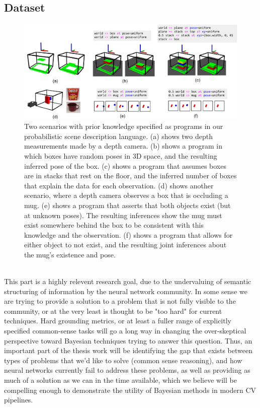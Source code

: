 
\subsection{Dataset}

\begin{figure}[t]
    \centering
    \includegraphics[width=\textwidth]{figures/lafi-fig.pdf}
    \caption{\small
Two scenarios with prior knowledge specified as programs in our probabilistic scene description language.
(a) shows two depth measurements made by a depth camera.
(b) shows a program in which boxes have random poses in 3D space, and the resulting inferred pose of the box.
(c) shows a program that assumes boxes are in stacks that rest on the floor, and the inferred number of boxes that explain the data for each observation.
(d) shows another scenario, where a depth camera observes a box that is occluding a mug.
(e) shows a program that asserts that both objects exist (but at unknown poses).
The resulting inferences show the mug must exist somewhere behind the box to be consistent with this knowledge and the observation.
(f) shows a program that allows for either object to not exist, and the resulting joint inferences about the mug's existence and pose.
}
    \label{fig:results}
\end{figure}

 \\

This part is a highly relevent research goal, due to the undervaluing of
semantic structuring of information by the neural network community. In some
sense we are trying to provide a solution to a problem that is not fully
visible to the community, or at the very least is thought to be "too hard" for
current techniques. Hard grounding metrics, or at least a fuller range of
explicitly specified common-sense tasks will go a long way in changing the
over-skeptical perspective toward Bayesian techniques trying to answer this
question. Thus, an important part of the thesis work will be identifying the
gap that exists between types of problems that we'd like to solve (common sense
reasoning), and how neural networks currently fail to address these problems,
as well as providing as much of a solution as we can in the time available,
which we believe will be compelling enough to demonstrate the utility of
Bayesian methods in modern CV pipelines.

